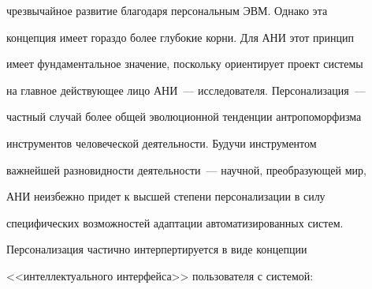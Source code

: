 чрезвычайное развитие благодаря персональным ЭВМ. Однако эта


концепция имеет гораздо более глубокие корни.  Для АНИ этот принцип


имеет фундаментальное значение, поскольку ориентирует проект системы


на главное действующее лицо АНИ~--- исследователя. Персонализация~---


частный случай более общей эволюционной тенденции антропоморфизма


инструментов человеческой деятельности. Будучи инструментом


важнейшей разновидности деятельности~--- научной, преобразующей мир,


АНИ неизбежно придет к высшей степени персонализации в силу


специфических возможностей адаптации автоматизированных систем.


Персонализация частично интерпертируется в виде концепции


<<интеллектуального интерфейса>>  пользователя с системой:


